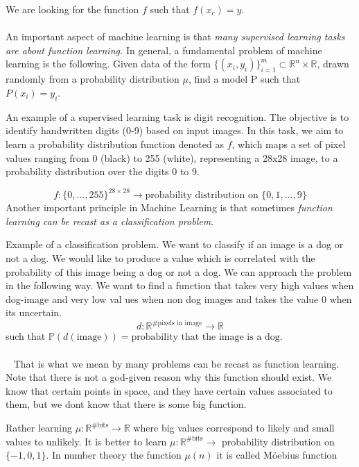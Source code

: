 \documentclass[../main.tex]{subfiles}
\begin{document}
	\noindent We are looking for the function $f$ such that $f(x_c)=y$.
	\\ \\ 
	\noindent 
	An important aspect of machine learning is that \textit{many supervised learning tasks are about function learning.} In general, a fundamental problem of machine learning is the following. Given data of the form $\{(x_i,y_i)\}^m_{i=1} \subset \mathbb{R}^n \times \mathbb{R}$, drawn randomly from a probability distribution $\mu$, find a model P such that $P(x_i)=y_i$. 
	\begin{xmpl}
		\noindent An example of a supervised learning task is digit recognition. The objective is to identify handwritten digits (0-9) based on input images. In this task, we aim to learn a probability distribution function denoted as $f$, which maps a set of pixel values ranging from 0 (black) to 255 (white), representing a 28x28 image, to a probability distribution over the digits 0 to 9.
		
		$$f: \{0,..., 255\}^{28 \times 28} \longrightarrow \text{probability distribution on } \{0,1,...,9\}$$
	Another important principle in Machine Learning is that sometimes \textit{function learning can be recast as a classification problem}.  
	\end{xmpl}
	\begin{xmpl} Example of a classification problem. We want to classify if an image is a dog or not a dog. We would like to produce a value which is correlated with the probability of this image being a dog or not a dog.  We can approach the problem in the following way. We want to find a function that takes very high values when dog-image and very low val ues when non dog images and takes the value 0 when its uncertain. 
		$$d: \mathbb{R}^{\# \text{pixels in image}} \rightarrow \mathbb{R} $$
		such that $\mathbb{P}(d(\text{image})) = \text{probability that the image is a dog.}$ \\ \\  
		That is what we mean by many problems can be recast as function learning. Note that there is not a god-given reason why this function should exist. We know that certain points in space, and they have certain values associated to them, but we dont know that there is some big function. 
	\end{xmpl}
\noindent
	Rather learning $\mu : \mathbb{R}^{\# \text{bits}} \rightarrow \mathbb{R}$ where big values correspond to likely and small values to unlikely. It is better to learn $\mu : \mathbb{R}^{\# \text{bits}} \rightarrow $ probability distribution on $\{-1,0,1\}$. In number theory the function $\mu(n)$ it is called Möebius function 
	
\end{document}
